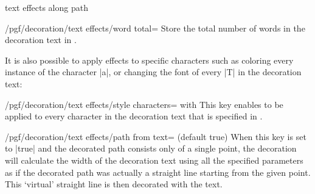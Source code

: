 \begin{decoration}{text effects along path}
    \begin{key}{/pgf/decoration/text effects/word total=}
        Store the total number of words in the decoration text in .
    \end{key}

    It is also possible to apply effects to specific characters such as
    coloring every instance of the character |a|, or changing the font of every
    |T| in the decoration text:

    \begin{key}{/pgf/decoration/text effects/style characters= with }
        This key enables  to be applied to every character in the
        decoration text that is specified in .
\begin{codeexample}[]
\end{codeexample}
    \end{key}

    \begin{key}{/pgf/decoration/text effects/path from text= (default true)}
        When this key is set to |true| and the decorated path consists only of
        a single point, the decoration will calculate the width of the
        decoration text using all the specified parameters as if the decorated
        path was actually a straight line starting from the given point. This
        `virtual' straight line is then decorated with the text.
\begin{codeexample}[]
\end{codeexample}
    \end{key}


\end{decoration}
